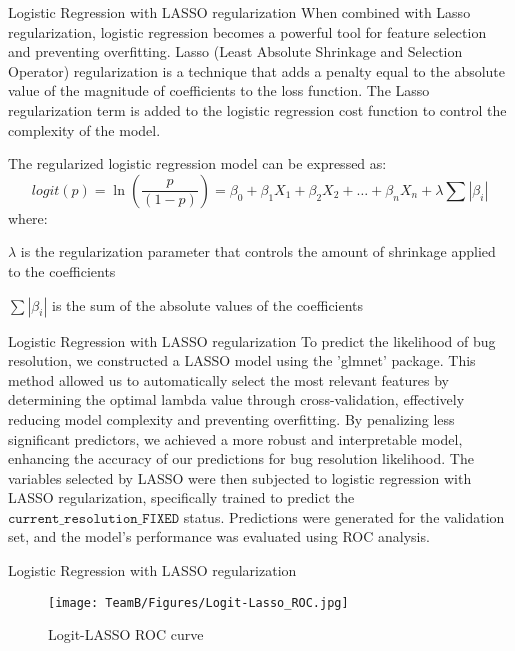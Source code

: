\documentclass[10pt]{beamer}
\begin{document}
\begin{frame}[t]{Logistic Regression with LASSO regularization} \justifying \vspace{8pt}
	When combined with Lasso regularization, logistic regression becomes a powerful tool for feature selection and preventing overfitting. Lasso (Least Absolute Shrinkage and Selection Operator) regularization is a technique that adds a penalty equal to the absolute value of the magnitude of coefficients to the loss function. The Lasso regularization term is added to the logistic regression cost function to control the complexity of the model. 
	
	The regularized logistic regression model can be expressed as:
	\[ logit\left( p\right)=\ln \left( \dfrac{p}{\left( 1-p\right) }\right) =\beta_{0}+\beta _{1}X_{1}+\beta _{2}X_{2}+\ldots +\beta_{n}X_{n} +\lambda \sum \left| \beta _{i}\right|\]
	where:
	\begin{description}[font=$\bullet$~\normalfont\scshape\color{red!50!black}]
		\item $\lambda$ is the regularization parameter that controls the amount of shrinkage applied to the coefficients
		\item $\sum \left| \beta _{i}\right|$ is the sum of the absolute values of the coefficients
	\end{description}
\end{frame}


\begin{frame}[t]{Logistic Regression with LASSO regularization} \justifying \vspace{10pt}
	To predict the likelihood of bug resolution, we constructed a LASSO model using the 'glmnet' package. This method allowed us to automatically select the most relevant features by determining the optimal lambda value through cross-validation, effectively reducing model complexity and preventing overfitting. By penalizing less significant predictors, we achieved a more robust and interpretable model, enhancing the accuracy of our predictions for bug resolution likelihood.
	\vskip 16pt 
	The variables selected by LASSO were then subjected to logistic regression with LASSO regularization, specifically trained to predict the $\texttt{current\_resolution\_FIXED}$ status. Predictions were generated for the validation set, and the model's performance was evaluated using ROC analysis.
\end{frame}


\begin{frame}[t]{Logistic Regression with LASSO regularization}\justifying \vspace{1pt}
	\begin{figure}[htp]
		\centering
		\texttt{[image: TeamB/Figures/Logit-Lasso\_ROC.jpg]}
		\caption{Logit-LASSO ROC curve}
		\label{fig:picture1}
	\end{figure}
\end{frame}
\end{document}
